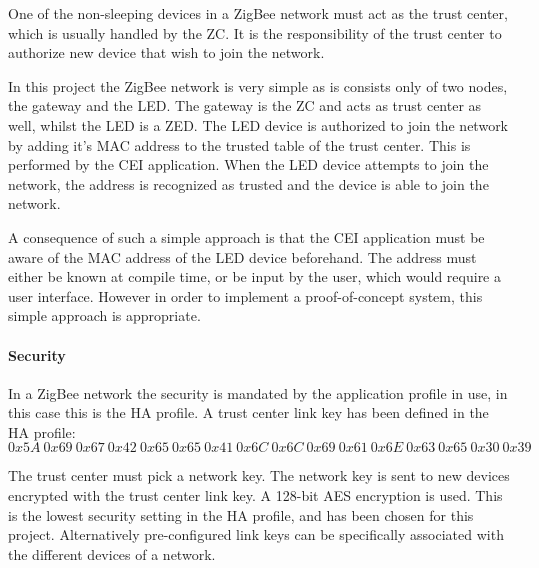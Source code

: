 \documentclass[Main]{subfiles}
\begin{document}
				One of the non-sleeping devices in a ZigBee network must act as the trust center, which is usually handled by the ZC. 
				It is the responsibility of the trust center to authorize new device that wish to join the network.

				In this project the ZigBee network is very simple as is consists only of two nodes, the gateway and the LED. 
				The gateway is the ZC and acts as trust center as well, whilst the LED is a ZED.
				The LED device is authorized to join the network by adding it's MAC address to the trusted table of the trust center. 
				This is performed by the CEI application.
				When the LED device attempts to join the network, the address is recognized as trusted and the device is able to join the network. 

				A consequence of such a simple approach is that the CEI application must be aware of the MAC address of the LED device beforehand. 
				The address must either be known at compile time, or be input by the user, which would require a user interface. 
				However in order to implement a proof-of-concept system, this simple approach is appropriate. 			
			\label{par:commissioning}
			



			\paragraph{Security} %
				In a ZigBee network the security is mandated by the application profile in use, in this case this is the HA profile.
				A trust center link key has been defined in the HA profile\cite{HASpec}:
				\begin{equation}
					0x5A\ 0x69\ 0x67\ 0x42\ 0x65\ 0x65\ 0x41\ 0x6C\ 0x6C\ 0x69\ 0x61\ 0x6E\ 0x63\ 0x65\ 0x30\ 0x39	
				\end{equation}
				
				The trust center must pick a network key. The network key is sent to new devices encrypted with the trust center link key.
				A 128-bit AES encryption is used.
				This is the lowest security setting in the HA profile, and has been chosen for this project. 
				Alternatively pre-configured link keys can be specifically associated with the different devices of a network.
			\label{par:security}
			

			





\end{document}
